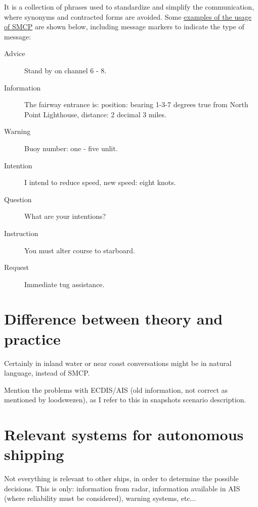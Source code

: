 It is a collection of phrases used to standardize and simplify the communication, where synonyms and contracted forms are avoided. Some \href{http://www.segeln.co.at/media/pdf/smcp.pdf}{examples of the usage of \ac{SMCP}} are shown below, including message markers to indicate the type of message:
\begin{description}
	\item [Advice] Stand by on channel 6 - 8.
	\item [Information] The fairway entrance is: position: bearing 1-3-7 degrees true from North Point Lighthouse, distance: 2 decimal 3 miles.
	\item [Warning] Buoy number: one - five unlit.
	\item [Intention] I intend to reduce speed, new speed: eight knots.
	\item [Question] What are your intentions?
	\item [Instruction] You must alter course to starboard.
	\item [Request] Immediate tug assistance.
\end{description}

\section{Difference between theory and practice}


Certainly in inland water or near coast conversations might be in natural language, instead of \ac{SMCP}.

Mention the problems with ECDIS/AIS (old information, not correct as mentioned by loodswezen), as I refer to this in snapshots scenario description. 

\section{Relevant systems for autonomous shipping}
\label{sec:relevant-systems}
Not everything is relevant to other ships, in order to determine the possible decisions. This is only: information from radar, information available in AIS (where reliability must be considered), warning systems, etc...


